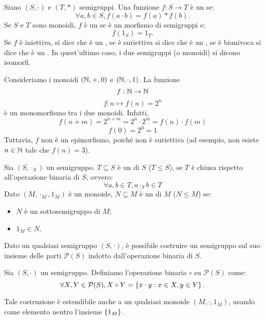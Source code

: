 \begin{definition}
  Siano \((S,\cdot)\) e \((T,*)\) semigruppi.
  Una funzione \(f: S \to T\) è un  se:
  \[\forall a,b \in S, f(a \cdot b) = f(a) * f(b).\]
  Se \(S\) e \(T\) sono monoidi, \(f\) è un  se è un morfismo di semigruppi e:
  \[f(1_S) = 1_T.\]
  Se \(f\) è iniettiva, si dice che è un , se è suriettiva si dice che è un , se è biunivoca si dice che è un .
  In quest'ultimo caso, i due semigruppi (o monoidi) si dicono isomorfi.
\end{definition}
\begin{example}
  Consideriamo i monoidi \((\mathbb{N}, +, 0)\) e \((\mathbb{N}, \cdot, 1)\).
  La funzione 
  \[f: \mathbb{N} \to \mathbb{N}\]
  \[f:n \mapsto f(n) = 2^n\]
  è un monomorfismo tra i due monoidi.
  Infatti,
  \[f(n+m) = 2^{n+m} = 2^n \cdot 2^m = f(n) \cdot f(m)\]
  \[ f(0) = 2^0 = 1\]
  Tuttavia, \(f\) non è un epimorfismo, poiché non è suriettiva (ad esempio, non esiste \(n \in \mathbb{N}\) tale che \(f(n) = 3\)).
\end{example}

\begin{definition}
  Sia \((S,\cdot_S)\) un semigruppo.
  \(T \subseteq S\) è un  di \(S\) (\(T \leq S\)), se \(T\) è chiusa rispetto all'operazione binaria di \(S\), ovvero:
  \[\forall a,b \in T, a \cdot_S b \in T\]
  Dato \((M,\cdot_M,1_M)\) è un monoide, \(N \subseteq M\) è un  di \(M\) (\(N \leq M\)) se:
  \begin{itemize}
    \item \(N\) è un sottosemigruppo di \(M\);
    \item \(1_M \in N\).
  \end{itemize}
\end{definition}

Dato un qualsiasi semigruppo \((S,\cdot)\), è possibile costruire un semigruppo sul suo insieme delle parti \(\mathcal{P}(S)\) indotto dall'operazione binaria di \(S\).
\begin{definition}
  Sia \((S,\cdot)\) un semigruppo.
  Definiamo l'operazione binaria \(\circ\) su \(\mathcal{P}(S)\) come:
  \[\forall X,Y \in \mathcal{P}(S), X \circ Y = \set{x \cdot y : x \in X, y \in Y}.\]
\end{definition}
Tale costruzione è estendibile anche a un qualsiasi monoide \((M,\cdot,1_M)\), usando come elemento neutro l'insieme \(\set{1_M}\).

